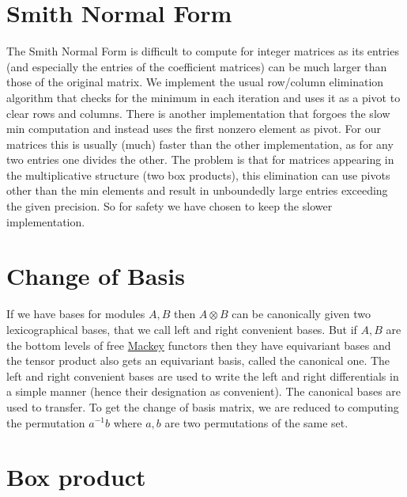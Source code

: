 \hypertarget{algo_smith}{}\section{Smith Normal Form}\label{algo_smith}
The Smith Normal Form is difficult to compute for integer matrices as its entries (and especially the entries of the coefficient matrices) can be much larger than those of the original matrix. We implement the usual row/column elimination algorithm that checks for the minimum in each iteration and uses it as a pivot to clear rows and columns. There is another implementation that forgoes the slow min computation and instead uses the first nonzero element as pivot. For our matrices this is usually (much) faster than the other implementation, as for any two entries one divides the other. The problem is that for matrices appearing in the multiplicative structure (two box products), this elimination can use pivots other than the min elements and result in unboundedly large entries exceeding the given precision. So for safety we have chosen to keep the slower implementation.\hypertarget{algo_cob}{}\section{Change of Basis}\label{algo_cob}
If we have bases for modules $A,B$ then $A\otimes B$ can be canonically given two lexicographical bases, that we call left and right convenient bases. But if $A,B$ are the bottom levels of free \hyperlink{namespaceMackey}{Mackey} functors then they have equivariant bases and the tensor product also gets an equivariant basis, called the canonical one. The left and right convenient bases are used to write the left and right differentials in a simple manner (hence their designation as convenient). The canonical bases are used to transfer. To get the change of basis matrix, we are reduced to computing the permutation $a^{-1}b$ where $a,b$ are two permutations of the same set.\hypertarget{algo_box}{}\section{Box product}\label{algo_box}
